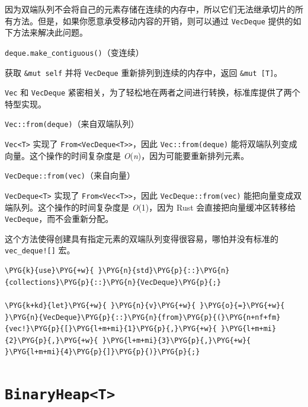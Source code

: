 因为双端队列不会将自己的元素存储在连续的内存中，所以它们无法继承切片的所有方法。但是，如果你愿意承受移动内容的开销，则可以通过 \texttt{VecDeque} 提供的如下方法来解决此问题。

\begin{myNote}
\texttt{deque.make\_contiguous()}（变连续）
\end{myNote}

获取 \texttt{\&mut self} 并将 \texttt{VecDeque} 重新排列到连续的内存中，返回 \texttt{\&mut [T]}。

\texttt{Vec} 和 \texttt{VecDeque} 紧密相关，为了轻松地在两者之间进行转换，标准库提供了两个特型实现。

\begin{mySidenote}
\texttt{Vec::from(deque)}（来自双端队列）
\end{mySidenote}

\texttt{Vec<T>} 实现了 \texttt{From<VecDeque<T>>}，因此 \texttt{Vec::from(deque)} 能将双端队列变成向量。这个操作的时间复杂度是 \emph{O}(\emph{n})，因为可能要重新排列元素。

\begin{mySidenote}
\texttt{VecDeque::from(vec)}（来自向量）
\end{mySidenote}

\texttt{VecDeque<T>} 实现了 \texttt{From<Vec<T>>}，因此 \texttt{VecDeque::from(vec)} 能把向量变成双端队列。这个操作的时间复杂度是 \emph{O}(1)，因为 Rust 会直接把向量缓冲区转移给 \texttt{VecDeque}，而不会重新分配。

这个方法使得创建具有指定元素的双端队列变得很容易，哪怕并没有标准的 \texttt{vec\_deque![]} 宏。

\begin{Verbatim}[commandchars=\\\{\},breaklines=true,breakanywhere=true,fontsize=\codefont,xleftmargin=17bp]
\PYG{k}{use}\PYG{+w}{ }\PYG{n}{std}\PYG{p}{::}\PYG{n}{collections}\PYG{p}{::}\PYG{n}{VecDeque}\PYG{p}{;}

\PYG{k+kd}{let}\PYG{+w}{ }\PYG{n}{v}\PYG{+w}{ }\PYG{o}{=}\PYG{+w}{ }\PYG{n}{VecDeque}\PYG{p}{::}\PYG{n}{from}\PYG{p}{(}\PYG{n+nf+fm}{vec!}\PYG{p}{[}\PYG{l+m+mi}{1}\PYG{p}{,}\PYG{+w}{ }\PYG{l+m+mi}{2}\PYG{p}{,}\PYG{+w}{ }\PYG{l+m+mi}{3}\PYG{p}{,}\PYG{+w}{ }\PYG{l+m+mi}{4}\PYG{p}{]}\PYG{p}{)}\PYG{p}{;}
\end{Verbatim}

\section{\texttt{BinaryHeap<T>}}

